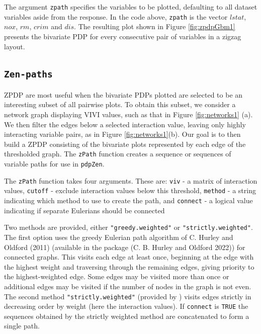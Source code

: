 The argument \texttt{zpath} specifies the variables to be plotted, defaulting to all dataset variables aside from the response. In the code above, \texttt{zpath} is the vector \(lstat\), \(nox\), \(rm\), \(crim\) and \(dis\). The resulting plot shown in Figure \ref{fig:zpdpGbm1} presents the bivariate PDP for every consecutive pair of variables in a zigzag layout.

\hypertarget{sec:zp}{%
\subsection{\texorpdfstring{\texttt{Zen-paths}}{Zen-paths}}\label{sec:zp}}

ZPDP are most useful when the bivariate PDPs plotted are selected to be an interesting subset of all pairwise plots. To obtain this subset, we consider a network graph displaying VIVI values, such as that in Figure \ref{fig:networks1} (a). We then filter the edges below a selected interaction value, leaving only highly interacting variable pairs, as in Figure \ref{fig:networks1}(b). Our goal is to then build a ZPDP consisting of the bivariate plots represented by each edge of the thresholded graph. The \texttt{zPath} function creates a sequence or sequences of variable paths for use in \texttt{pdpZen}.

The \texttt{zPath} function takes four arguments. These are:
\texttt{viv} - a matrix of interaction values,
\texttt{cutoff} - exclude interaction values below this threshold,
\texttt{method} - a string indicating which method to use to create the path, and
\texttt{connect} - a logical value indicating if separate Eulerians should be connected

Two methods are provided, either \texttt{"greedy.weighted"} or \texttt{"strictly.weighted"}. The first option uses the greedy Eulerian path algorithm of C. Hurley and Oldford (2011) (available in the  package (C. B. Hurley and Oldford 2022)) for connected graphs. This visits each edge at least once, beginning at the edge with the highest weight and traversing through the remaining edges, giving priority to the highest-weighted edge. Some edges may be visited more than once or additional edges may be visited if the number of nodes in the graph is not even. The second method \texttt{"strictly.weighted"} (provided by ) visits edges strictly in decreasing order by weight (here the interaction values). If \texttt{connect} is \texttt{TRUE} the sequences obtained by the strictly weighted method are concatenated to form a single path.

